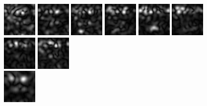 \begin{figure}
\begin{center}
 \includegraphics[scale=0.5]{ch4/figures/mag_-1_0.jpg}
 \includegraphics[scale=0.5]{ch4/figures/mag_-1_1.jpg}
 \includegraphics[scale=0.5]{ch4/figures/mag_-1_2.jpg}
 \includegraphics[scale=0.5]{ch4/figures/mag_-1_3.jpg}
 \includegraphics[scale=0.5]{ch4/figures/mag_-1_4.jpg}
 \includegraphics[scale=0.5]{ch4/figures/mag_-1_5.jpg}
 \includegraphics[scale=0.5]{ch4/figures/mag_-1_6.jpg}
 \includegraphics[scale=0.5]{ch4/figures/mag_-1_7.jpg}\\
 \includegraphics[scale=0.5]{ch4/figures/mag_0_0.jpg}

\end{center}
\end{figure}
